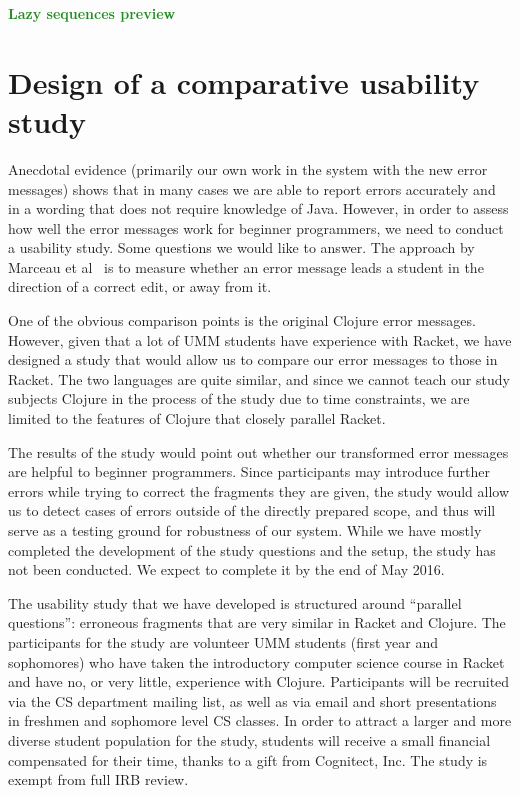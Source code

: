 \documentclass[submission,copyright,creativecommons]{eptcs}
\newcommand{\allcomments}[1]{{#1}}
\newcommand{\emcomment}[1]{{\bf \textcolor{ForestGreen}{\allcomments{{#1}}}}}
\begin{document}
\emcomment{Lazy sequences preview}

\section{Design of a comparative usability study}\label{sec:study}
Anecdotal evidence (primarily our own work in the system with the new error messages) shows that 
in many cases we are able to report errors accurately and in a wording that does not require 
knowledge of Java. However, in order to assess how well the error messages work for beginner 
programmers, we need to conduct a usability study. Some questions we would like to answer. 
The approach by Marceau et al~\cite{Marceau:2011} is to measure whether an error message 
leads a student in the direction of a correct edit, or away from it. 

One of the obvious comparison points is the original Clojure error messages. However, given that 
a lot of UMM students have experience with Racket, we have designed a study that would allow us 
to compare our error messages to those in Racket. The two languages are quite similar, and since we
cannot teach our study subjects Clojure in the process of the study due to time constraints, we are 
limited to the features of Clojure that closely parallel Racket. 

The results of the study would point out whether our transformed error messages are helpful to beginner 
programmers. 
Since participants may introduce further errors while trying to correct the fragments they are given, 
the study would allow us to detect cases of errors outside of the directly prepared scope, and thus
will serve as a testing ground for robustness of our system.  
While we have mostly completed the development of the study questions and the setup, the
study has not been conducted. We expect to complete it by the end of May 2016. 

The usability study that we have developed is structured around ``parallel questions'': erroneous fragments that are very similar in 
Racket and Clojure. 
The participants for the study are volunteer UMM students (first year and sophomores) who have taken the introductory computer science course in Racket and have no, or very little, experience with Clojure.
Participants will be recruited via the CS department mailing list, as well as via email and short presentations in freshmen and sophomore level CS classes. 
In order to attract a larger and more diverse student population for the study, students will receive a small financial compensated for their time, thanks to a gift from Cognitect, Inc. 
The study is exempt from full IRB review. 
\end{document}
